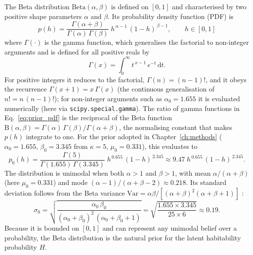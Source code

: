 The Beta distribution $\mathrm{Beta}(\alpha, \beta)$ is defined on $[0, 1]$
and characterised by two positive shape parameters $\alpha$ and $\beta$.
Its probability density function (PDF) is
\begin{equation}
  p(h) = \frac{\Gamma(\alpha + \beta)}{\Gamma(\alpha)\,\Gamma(\beta)}\;
  h^{\,\alpha - 1}\,(1 - h)^{\,\beta - 1}, \qquad h \in [0,1]
  \label{eq:prior_pdf}
\end{equation}
where $\Gamma(\cdot)$ is the gamma function, which generalises the factorial to
non-integer arguments and is defined for all positive reals by
\begin{equation}
  \Gamma(x) = \int_0^{\infty} t^{\,x-1}\,e^{-t}\,\mathrm{d}t .
  \label{eq:gamma_def}
\end{equation}
For positive integers it reduces to the factorial, $\Gamma(n) = (n-1)!$, and it
obeys the recurrence $\Gamma(x+1) = x\,\Gamma(x)$ (the continuous generalisation
of $n! = n\,(n-1)!$); for non-integer arguments such as $\alpha_0 = 1.655$ it is
evaluated numerically (here via \texttt{scipy.special.gamma}).  The ratio of
gamma functions in Eq.~\ref{eq:prior_pdf} is the reciprocal of the Beta function
$\mathrm{B}(\alpha,\beta) = \Gamma(\alpha)\,\Gamma(\beta)/\Gamma(\alpha+\beta)$,
the normalising constant that makes $p(h)$ integrate to one.  For the prior
adopted in Chapter~\ref{ch:methods} ($\alpha_0 = 1.655$, $\beta_0 = 3.345$ from
$\kappa = 5$, $\mu_0 = 0.331$), this evaluates to
\begin{equation}
  p_0(h) = \frac{\Gamma(5)}{\Gamma(1.655)\,\Gamma(3.345)}\;
  h^{\,0.655}\,(1 - h)^{\,2.345}
  \approx 9.47\;h^{\,0.655}\,(1 - h)^{\,2.345} .
  \label{eq:prior_pdf_numeric}
\end{equation}
The distribution is unimodal when both $\alpha > 1$ and $\beta > 1$, with mean
$\alpha/(\alpha + \beta)$ (here $\mu_0 = 0.331$) and mode
$(\alpha-1)/(\alpha+\beta-2) \approx 0.218$.  Its standard deviation follows from
the Beta variance $\mathrm{Var} = \alpha\beta/[(\alpha+\beta)^2(\alpha+\beta+1)]$
\citep[p.~581, Table~A.1]{Gelman2013}:
\begin{equation}
  \sigma_0 = \sqrt{\frac{\alpha_0\,\beta_0}{(\alpha_0+\beta_0)^2\,(\alpha_0+\beta_0+1)}}
  = \sqrt{\frac{1.655 \times 3.345}{25 \times 6}} \approx 0.19 .
  \label{eq:prior_sd}
\end{equation}
Because it is bounded on $[0,1]$ and can represent any unimodal belief over a
probability, the Beta distribution is the natural prior for the latent
habitability probability $H$.

